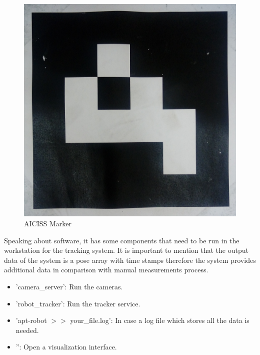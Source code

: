 \documentclass[10pt]{scrartcl}
\begin{document}
\begin{figure}[h!]
\centering
\includegraphics[angle=-90,scale=0.05]{images/marker}
\caption{AICISS Marker}
\label{fig:marker}
\end{figure}

Speaking about software, it has some components that need to be run in the workstation for the tracking system. It is important to mention that the output data of the system is a pose array with time stamps therefore the system provides additional data in comparison with manual measurements process.

\begin{itemize}
	\item 'camera\_server': Run the cameras.
	\item 'robot\_tracker': Run the tracker service.
	\item 'apt-robot $>>$ your\_file.log': In case a log file which stores all the data is needed.
	\item '': Open a visualization interface.%
\end{itemize}

\end{document}

